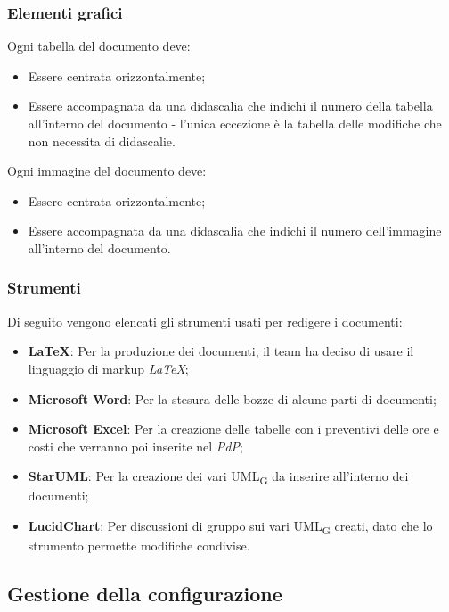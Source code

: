 \subsubsection{Elementi grafici}

Ogni tabella del documento deve:
\begin{itemize}
\item Essere centrata orizzontalmente;
\item Essere accompagnata da una didascalia che indichi il numero della tabella all'interno del documento - l'unica eccezione è la tabella delle modifiche che non necessita di didascalie.
\end{itemize}

Ogni immagine del documento deve:
\begin{itemize}
\item Essere centrata orizzontalmente;
\item Essere accompagnata da una didascalia che indichi il numero dell'immagine all'interno del documento.
\end{itemize}

\subsubsection{Strumenti}
Di seguito vengono elencati gli strumenti usati per redigere i documenti:
\begin{itemize}
\item \textbf{\LaTeX}: Per la produzione dei documenti, il team ha deciso di usare il linguaggio di markup \textit{\LaTeX};
\item \textbf{Microsoft Word}: Per la stesura delle bozze di alcune parti di documenti;
\item \textbf{Microsoft Excel}: Per la creazione delle tabelle con i preventivi delle ore e costi che verranno poi inserite nel \textit{PdP};
\item \textbf{StarUML}: Per la creazione dei vari UML\textsubscript{G} da inserire all'interno dei documenti;
\item \textbf{LucidChart}: Per discussioni di gruppo sui vari UML\textsubscript{G} creati, dato che lo strumento permette modifiche condivise.
\end{itemize}


\subsection{Gestione della configurazione}

